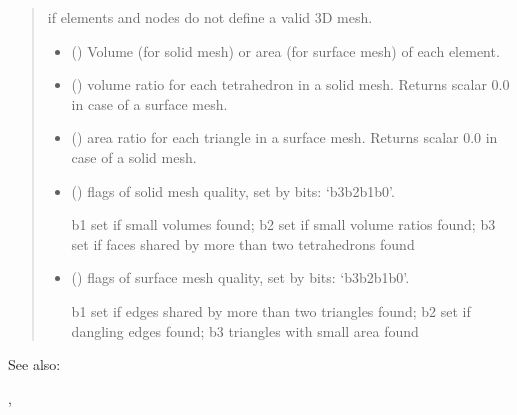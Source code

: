 \documentclass[letterpaper,10pt,english]{sphinxmanual}
\begin{document}
\begin{fulllineitems}
\begin{quote}
\begin{description}
\begin{itemize}
\end{itemize}

\sphinxAtStartPar
{} \textendash{} if elements and nodes do not define a valid 3D mesh.

\sphinxAtStartPar
\begin{itemize}
\item {} 
\sphinxAtStartPar
{} () \textendash{} Volume (for solid mesh) or area (for surface mesh) of each element.

\item {} 
\sphinxAtStartPar
{} () \textendash{} volume ratio for each tetrahedron in a solid mesh. Returns scalar 0.0 in case of a surface mesh.

\item {} 
\sphinxAtStartPar
{} () \textendash{} area ratio for each triangle in a surface mesh. Returns scalar 0.0 in case of a solid mesh.

\item {} 
\sphinxAtStartPar
{} () \textendash{} flags of solid mesh quality, set by bits: ‘b3b2b1b0’.

\sphinxAtStartPar
b1 set if small volumes found; b2 set if small volume ratios found; b3 set if faces shared by more than two tetrahedrons found

\item {} 
\sphinxAtStartPar
{} () \textendash{} flags of surface mesh quality, set by bits: ‘b3b2b1b0’.

\sphinxAtStartPar
b1 set if edges shared by more than two triangles found; b2 set if dangling edges found; b3 triangles with small area found

\end{itemize}


\end{description}\end{quote}


\begin{sphinxseealso}{See also:}

\sphinxAtStartPar
{}, 


\end{sphinxseealso}


\end{fulllineitems}
\end{document}
